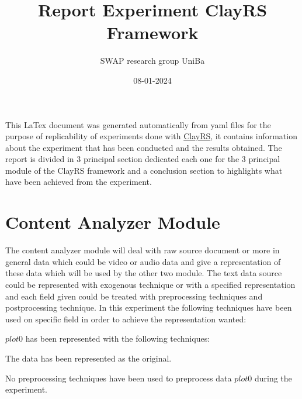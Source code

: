 \documentclass[11pt]{article}
\title{Report Experiment ClayRS Framework}
\author{SWAP research group UniBa}
\date{08-01-2024}
\begin{document}
\maketitle
This LaTex document was generated automatically from yaml files for the purpose of replicability of experiments done with
\href{https://github.com/swapUniba/ClayRS}{ClayRS},
it contains information about the experiment that has been conducted and the results obtained.
The report is divided in 3 principal section dedicated each one for the 3 principal module of the ClayRS framework
and a conclusion section to highlights what have been achieved from the experiment.
\hfill\break
\hfill\break



\section{Content Analyzer Module}\label{sec:ca}
The content analyzer module will deal with raw source document or more in general data which could be
video or audio data and give a representation of these data which will be used by the other two module.
The text data source could be represented with exogenous technique or with a specified representation
and each field given could be treated with preprocessing techniques and postprocessing technique.
In this experiment the following techniques have been used on specific field in order to achieve the
representation wanted:
\hfill\break
\hfill\break



$ plot0 $  has been represented with the following techniques:
\hfill\break
\hfill\break



The data has been represented as the original.
\hfill\break
\hfill\break



No preprocessing techniques have been used to preprocess data $ plot0 $ during the experiment.
\hfill\break
\hfill\break
{}
\end{document}
